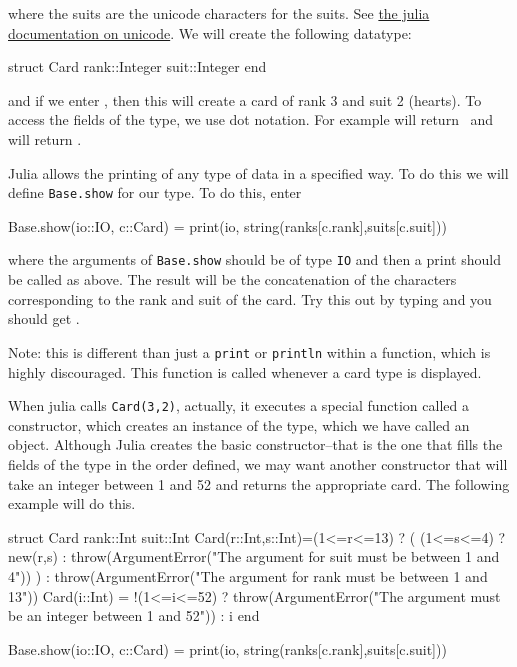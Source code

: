 %
where the suits are the unicode characters for the suits. See
\href{http://docs.julialang.org/en/latest/manual/unicode-input/}{the
julia documentation on unicode}. We will create the following datatype:
\begin{jlblock}[newtype2]
struct Card
    rank::Integer
    suit::Integer
end
\end{jlblock}
%
and if we enter , then this will create a card of rank 3 and suit 2 (hearts). To access the fields of the type, we use dot notation. For example 
will return  \printpythontex[verb] ~and  will return  \printpythontex[verb]. 

Julia allows the printing of any type of data in a specified way.  To do this we will define \texttt{Base.show} for our type. To do this, enter
\begin{jlblock}[newtype2]
Base.show(io::IO, c::Card) = print(io, string(ranks[c.rank],suits[c.suit]))
\end{jlblock}
%
where the arguments of \texttt{Base.show} should be of type \texttt{IO}
and then a print should be called as above. The result will be the concatenation of the characters corresponding to the rank and suit of the card.  Try this out by typing  and you should get  \printpythontex[verb]. 


Note: this is different than just a \texttt{print} or \texttt{println} within a function, which is highly discouraged. This function is called whenever a card type is displayed. 

When julia calls \texttt{Card(3,2)}, actually, it executes a special function called a constructor, which creates an instance of the type, which we have called an object. Although Julia creates the basic constructor--that is the one that fills the fields of the type in the order defined, we may want another constructor that will take an integer between 1 and 52 and returns the appropriate card. The following example
will do this.

\begin{jlblock}[newtype][numbers=left]
struct Card
  rank::Int
  suit::Int
  Card(r::Int,s::Int)=(1<=r<=13) ? ( (1<=s<=4) ? new(r,s) :
    throw(ArgumentError("The argument for suit must be between 1 and 4")) ) :
	throw(ArgumentError("The argument for rank must be between 1 and 13")) 
  Card(i::Int) = !(1<=i<=52) ? 
    throw(ArgumentError("The argument must be an integer between 1 and 52")) : 
    i%
end
\end{jlblock}
\begin{jlcode}[newtype]
Base.show(io::IO, c::Card) = print(io, string(ranks[c.rank],suits[c.suit]))
\end{jlcode}

